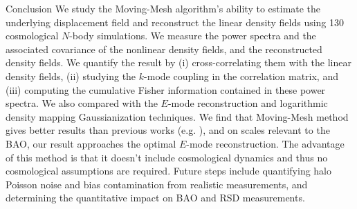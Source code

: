\begin{section}{Conclusion}
  \label{sec:conclusion}
  We study the Moving-Mesh algorithm's ability to estimate the underlying displacement 
  field and reconstruct the linear density fields using 130 cosmological $N$-body 
  simulations.  We measure the power spectra and the associated covariance of the 
  nonlinear density fields, and the reconstructed density fields.  We quantify the 
  result by (i) cross-correlating them with the linear density fields, (ii) studying 
  the $k$-mode coupling in the correlation matrix, and (iii) computing the cumulative 
  Fisher information contained in these power spectra.  We also
  compared with the $E$-mode 
  reconstruction and logarithmic density mapping Gaussianization
  techniques.
We find that Moving-Mesh method gives better results than previous works
  (e.g. \citealt{bib:Mark2009,bib:Zhang2011,bib:HarnoisD2013}), and on scales 
  relevant to the BAO, our result approaches the optimal $E$-mode reconstruction.  
  The advantage of this method is that it doesn't include cosmological dynamics and thus 
  no cosmological assumptions are required.
  Future steps include quantifying halo Poisson noise and bias contamination 
  from realistic measurements, and determining the quantitative impact on
  BAO and RSD measurements.  

\end{section}
